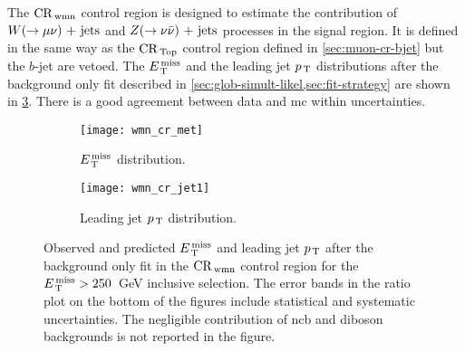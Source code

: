 The $\mathrm{CR}_\mathrm{\, wmn}$ control region is designed to estimate the contribution of
$W (\rightarrow \mu \nu)\mathrm{~+~jets}$ and $Z (\rightarrow \nu \bar{\nu})\mathrm{~+~jets}$ processes in the signal region. It is
defined in the same way as the $\mathrm{CR}_\mathrm{\, Top}$ control region defined in
\cref{sec:muon-cr-bjet} but the $b$-jet are vetoed. The $E_\mathrm{\, T}^\mathrm{\, miss}$ and the leading
jet $p_\mathrm{\, T}$ distributions after the background only fit described in
\cref{sec:glob-simult-likel,sec:fit-strategy} are shown in
\cref{fig:wmn_plots}. There is a good agreement between data and \gls{mc} within
uncertainties.
\begin{figure}[!th]
  \centering
  \begin{subfigure}[t]{.48\linewidth}
    \texttt{[image: wmn\_cr\_met]}
    \caption{$E_\mathrm{\, T}^\mathrm{\, miss}$ distribution.}
    \label{fig:wmn_cr_et_miss}
  \end{subfigure}
  \begin{subfigure}[t]{.48\linewidth}
    \texttt{[image: wmn\_cr\_jet1]}
    \caption{Leading jet $p_\mathrm{\, T}$ distribution.}
    \label{fig:wmn_cr_jet1}
  \end{subfigure}
  \caption{Observed and predicted $E_\mathrm{\, T}^\mathrm{\, miss}$ and leading jet $p_\mathrm{\, T}$ after the
    background only fit in the $\mathrm{CR}_\mathrm{\, wmn}$ control region for the $E_\mathrm{\, T}^\mathrm{\, miss} > 250$~GeV
    inclusive selection. The error bands in the ratio plot on the bottom of the
    figures include statistical and systematic uncertainties. The negligible
    contribution of \gls{ncb} and diboson backgrounds is not reported in the
    figure.}
  \label{fig:wmn_plots}
\end{figure}
